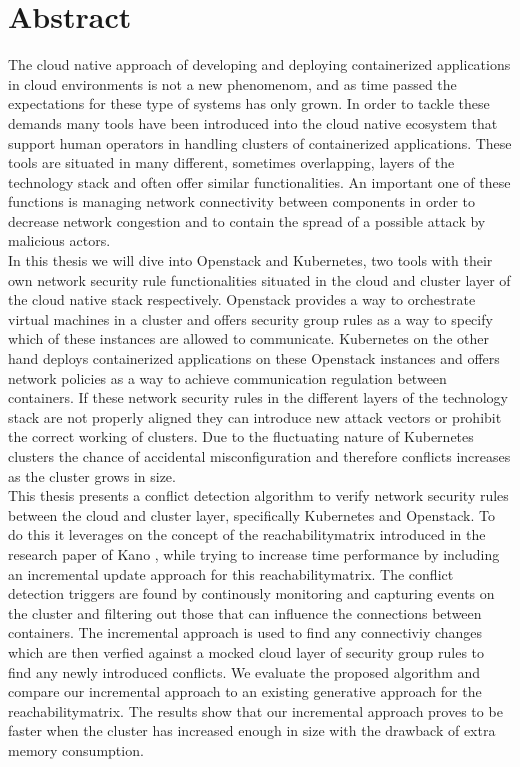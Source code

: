 \chapter{Abstract} \label{ch:abstract}
The cloud native approach of developing and deploying containerized applications in cloud environments is not a new phenomenom, and as time passed the expectations for these type of systems has only grown. In order to tackle these demands many tools have been introduced into the cloud native ecosystem that support human operators in handling clusters of containerized applications. These tools are situated in many different, sometimes overlapping, layers of the technology stack and often offer similar functionalities. An important one of these functions is managing network connectivity between components in order to decrease network congestion and to contain the spread of a possible attack by malicious actors. \\[10pt]

In this thesis we will dive into Openstack and Kubernetes, two tools with their own network security rule functionalities situated in the cloud and cluster layer of the cloud native stack respectively. Openstack provides a way to orchestrate virtual machines in a cluster and offers security group rules as a way to specify which of these instances are allowed to communicate. Kubernetes on the other hand deploys containerized applications on these Openstack instances and offers network policies as a way to achieve communication regulation between containers. If these network security rules in the different layers of the technology stack are not properly aligned they can introduce new attack vectors or prohibit the correct working of clusters. Due to the fluctuating nature of Kubernetes clusters the chance of accidental misconfiguration and therefore conflicts increases as the cluster grows in size.
\\[10pt]

This thesis presents a conflict detection algorithm to verify network security rules between the cloud and cluster layer, specifically Kubernetes and Openstack. To do this it leverages on the concept of the reachabilitymatrix introduced in the research paper of Kano \cite{kano}, while trying to increase time performance by including an incremental update approach for this reachabilitymatrix. The conflict detection triggers are found by continously monitoring and capturing events on the cluster and filtering out those that can influence the connections between containers. The incremental approach is used to find any connectiviy changes which are then verfied against a mocked cloud layer of security group rules to find any newly introduced conflicts. We evaluate the proposed algorithm and compare our incremental approach to an existing generative approach for the reachabilitymatrix. The results show that our incremental approach proves to be faster when the cluster has increased enough in size with the drawback of extra memory consumption. 
\cleardoublepage

